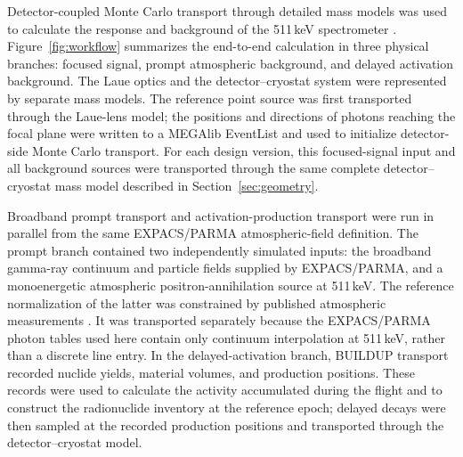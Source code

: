 \documentclass[11pt]{article}
\begin{document}
Detector-coupled Monte Carlo transport through detailed mass models was used to calculate the response and background of the 511\,keV spectrometer \cite{Sturner2003}. Figure~\ref{fig:workflow} summarizes the end-to-end calculation in three physical branches: focused signal, prompt atmospheric background, and delayed activation background. The Laue optics and the detector--cryostat system were represented by separate mass models. The reference point source was first transported through the Laue-lens model; the positions and directions of photons reaching the focal plane were written to a MEGAlib EventList and used to initialize detector-side Monte Carlo transport. For each design version, this focused-signal input and all background sources were transported through the same complete detector--cryostat mass model described in Section~\ref{sec:geometry}.

Broadband prompt transport and activation-production transport were run in parallel from the same EXPACS/PARMA atmospheric-field definition. The prompt branch contained two independently simulated inputs: the broadband gamma-ray continuum and particle fields supplied by EXPACS/PARMA, and a monoenergetic atmospheric positron-annihilation source at 511\,keV. The reference normalization of the latter was constrained by published atmospheric measurements \cite{Mahoney1981Atmospheric,Harris2003Atmospheric}. It was transported separately because the EXPACS/PARMA photon tables used here contain only continuum interpolation at 511\,keV, rather than a discrete line entry. In the delayed-activation branch, BUILDUP transport recorded nuclide yields, material volumes, and production positions. These records were used to calculate the activity accumulated during the flight and to construct the radionuclide inventory at the reference epoch; delayed decays were then sampled at the recorded production positions and transported through the detector--cryostat model.
\end{document}
